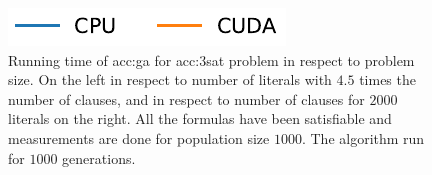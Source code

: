\begin{figure}[ht!]
    \begin{minipage}[t]{0.15\textwidth}
        \includegraphics[width=\textwidth]{img/runs/time_ga_clausecount_legend.pdf}
    \end{minipage}

    \caption[Running time of Genetic Algorithm in respect to problem size]{Running time of \acrlong{acc:ga} for \acrshort{acc:3sat} problem in respect to problem size. On the left in respect to number of literals with $4.5$ times the number of clauses, and in respect to number of clauses for $2000$ literals on the right. All the formulas have been satisfiable and measurements are done for population size $1000$. The algorithm run for $1000$ generations.}
\end{figure}

